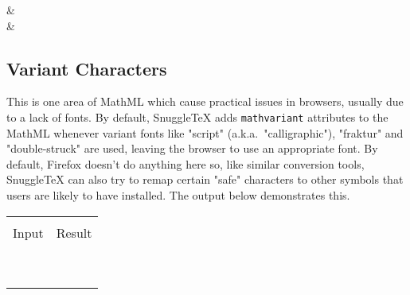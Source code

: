 \begin{ndemotable}
 &  \\

 &  \\

\end{ndemotable}

\subsection*{Variant Characters}

This is one area of MathML which cause practical issues in browsers, usually due to a lack
of fonts. By default, SnuggleTeX adds \texttt{mathvariant} attributes to the MathML whenever
variant fonts like "script" (a.k.a.\ "calligraphic"), "fraktur" and "double-struck" are used,
leaving the browser to use an appropriate font. By default, Firefox doesn't do anything here
so, like similar conversion tools, SnuggleTeX can also try to remap certain "safe" characters
to other symbols that users are likely to have installed. The output below demonstrates this.

\newcommand{\vcdemo}[1]{\minout{#1{abcdefghijklmnopqrstuvwxyz}} \\ }
\newcommand{\vcudemo}[1]{\minout{#1{ABCDEFGHIJKLMNOPQRSTUVWXYZ}} \\ }
\newenvironment{vctable}
{\begin{center}
 \begin{tabular}{|r|l|}
 \hline \\
 Input & Result \\
 \hline \\
}{\hline
 \end{tabular}
 \end{center}
}
\begin{vctable}
\vcdemo{\mathcal}
\vcudemo{\mathcal}
\vcdemo{\mathsc}
\vcudemo{\mathsc}
\vcdemo{\mathbb}
\vcudemo{\mathbb}
\vcdemo{\mathfrak}
\vcudemo{\mathfrak}
\end{vctable}

